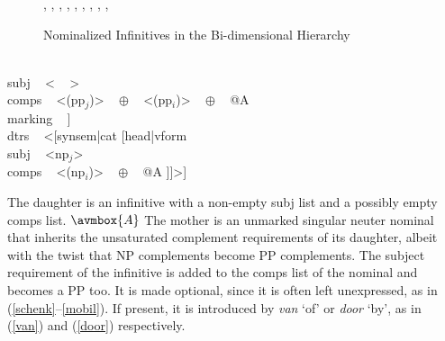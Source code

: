 \documentclass[output=paper]{langsci/langscibook}
\begin{document}
\begin{figure}
\begin{center}
\footnotesize
\tree
   {,
     {, 
        {,
          {},
          {,
            {}}, 
          {}}},
     {, 
       {},
       {}}}
\caption{\label{bido6} Nominalized Infinitives in the Bi-dimensional Hierarchy  } 
\normalsize
\end{center}
\end{figure}

\begin{exe} 
\ex\label{nominf} 
\begin{avm} 
[\type{nom-inf-phr}                                      \\
 synsem|cat [head [\type{noun}                           \\
                   number ~ \type{singular}              \\
                   gender ~ \type{neuter}]               \\
             subj ~ < ~ >                                 \\
             comps ~ <(pp$_{j}$)> ~ $\oplus$ ~ <(pp$_{i}$)> ~ $\oplus$ ~ @A \\ 
             marking ~ ]                     \\           
 dtrs ~ <[synsem|cat [head|vform ~                \\
                      subj ~ <np$_{j}$>                         \\
                      comps ~ <(np$_{i}$)> ~ $\oplus$ ~ @A ]]>]
\end{avm}
\end{exe}

\noindent
The daughter is an infinitive with a non-empty {\sc subj} list and 
a possibly empty {\sc comps} list. $\avmbox{A}$  
The mother is an unmarked singular neuter nominal that inherits the 
unsaturated complement requirements of its daughter, 
albeit with the twist that NP complements become PP complements. 
The subject requirement of the infinitive is added to the {\sc comps} list 
of the nominal and becomes a PP too. It is made optional, since 
it is often left unexpressed, as in (\ref{schenk}--\ref{mobil}). If present,  
it is introduced by \emph{van} `of' or \emph{door} `by', as in 
(\ref{van}) and (\ref{door}) respectively. 
\end{document}
